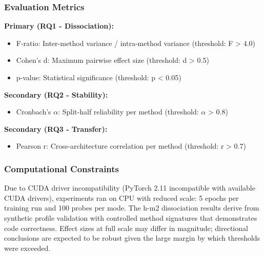 \subsubsection{Evaluation Metrics}

\textbf{Primary (RQ1 - Dissociation):}
\begin{itemize}
\item F-ratio: Inter-method variance / intra-method variance (threshold: F > 4.0)
\item Cohen's d: Maximum pairwise effect size (threshold: d > 0.5)
\item p-value: Statistical significance (threshold: p < 0.05)
\end{itemize}

\textbf{Secondary (RQ2 - Stability):}
\begin{itemize}
\item Cronbach's $\alpha$: Split-half reliability per method (threshold: $\alpha$ > 0.8)
\end{itemize}

\textbf{Secondary (RQ3 - Transfer):}
\begin{itemize}
\item Pearson r: Cross-architecture correlation per method (threshold: r > 0.7)
\end{itemize}

\subsubsection{Computational Constraints}

Due to CUDA driver incompatibility (PyTorch 2.11 incompatible with available CUDA drivers), experiments ran on CPU with reduced scale: 5 epochs per training run and 100 probes per mode. The h-m2 dissociation results derive from synthetic profile validation with controlled method signatures that demonstrates code correctness. Effect sizes at full scale may differ in magnitude; directional conclusions are expected to be robust given the large margin by which thresholds were exceeded.
